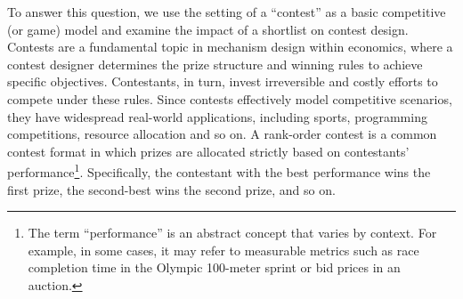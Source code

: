 To answer this question, we use the setting of a ``contest'' as a basic competitive (or game) model and examine the impact of a shortlist on contest design. Contests are a fundamental topic in mechanism design within economics, where a contest designer determines the prize structure and winning rules to achieve specific objectives. Contestants, in turn, invest irreversible and costly efforts to compete under these rules. Since contests effectively model competitive scenarios, they have widespread real-world applications, including sports, programming competitions, resource allocation and so on. A rank-order contest is a common contest format in which prizes are allocated strictly based on contestants' performance\footnote{The term “performance” is an abstract concept that varies by context. For example, in some cases, it may refer to measurable metrics such as race completion time in the Olympic 100-meter sprint or bid prices in an auction.}. Specifically, the contestant with the best performance wins the first prize, the second-best wins the second prize, and so on.




